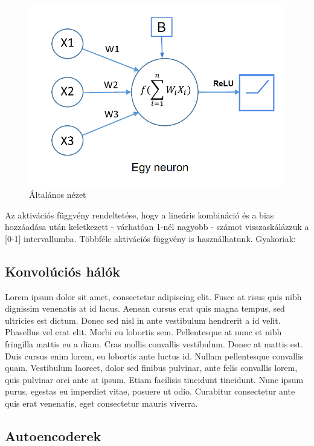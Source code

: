 \documentclass[12pt]{article}
\begin{document}
\begin{figure}[h!]
  \includegraphics[width=\linewidth]{neuron.png}
  \caption{Általános nézet}
\end{figure}

Az aktivációs függvény rendeltetése, hogy a lineáris kombináció és a bias hozzáadása után keletkezett - várhatóan 1-nél nagyobb - számot visszaskálázzuk a [0-1] intervallumba.
Többféle aktivációs függvény is használhatunk. Gyakoriak:

\subsection{Konvolúciós hálók}

Lorem ipsum dolor sit amet, consectetur adipiscing elit. Fusce at risus quis nibh dignissim venenatis at id lacus. Aenean cursus erat quis magna tempus, sed ultricies est dictum. Donec sed nisl in ante vestibulum hendrerit a id velit. Phasellus vel erat elit. Morbi eu lobortis sem. Pellentesque at nunc et nibh fringilla mattis eu a diam. Cras mollis convallis vestibulum. Donec at mattis est. Duis cursus enim lorem, eu lobortis ante luctus id. Nullam pellentesque convallis quam. Vestibulum laoreet, dolor sed finibus pulvinar, ante felis convallis lorem, quis pulvinar orci ante at ipsum. Etiam facilisis tincidunt tincidunt. Nunc ipsum purus, egestas eu imperdiet vitae, posuere ut odio. Curabitur consectetur ante quis erat venenatis, eget consectetur mauris viverra.

\subsection{Autoencoderek}
\end{document}
